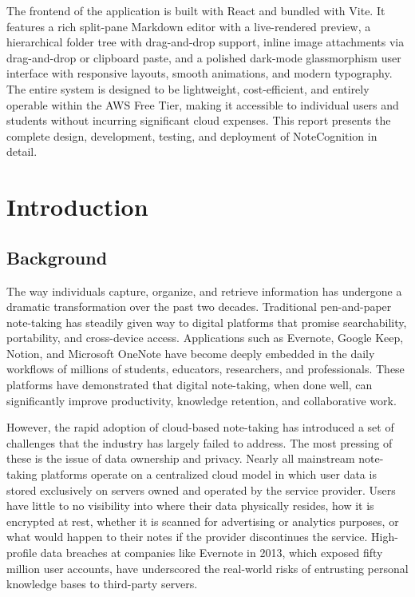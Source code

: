 \documentclass[12pt, a4paper, oneside]{report}
\begin{document}
The frontend of the application is built with React and bundled with Vite. It features a rich split-pane Markdown editor with a live-rendered preview, a hierarchical folder tree with drag-and-drop support, inline image attachments via drag-and-drop or clipboard paste, and a polished dark-mode glassmorphism user interface with responsive layouts, smooth animations, and modern typography. The entire system is designed to be lightweight, cost-efficient, and entirely operable within the AWS Free Tier, making it accessible to individual users and students without incurring significant cloud expenses. This report presents the complete design, development, testing, and deployment of NoteCognition in detail.

\tableofcontents
\listoffigures
{}
\listoftables
{}

\cleardoublepage
{}

\chapter{Introduction}

\section{Background}

The way individuals capture, organize, and retrieve information has undergone a dramatic transformation over the past two decades. Traditional pen-and-paper note-taking has steadily given way to digital platforms that promise searchability, portability, and cross-device access. Applications such as Evernote, Google Keep, Notion, and Microsoft OneNote have become deeply embedded in the daily workflows of millions of students, educators, researchers, and professionals. These platforms have demonstrated that digital note-taking, when done well, can significantly improve productivity, knowledge retention, and collaborative work.

However, the rapid adoption of cloud-based note-taking has introduced a set of challenges that the industry has largely failed to address. The most pressing of these is the issue of data ownership and privacy. Nearly all mainstream note-taking platforms operate on a centralized cloud model in which user data is stored exclusively on servers owned and operated by the service provider. Users have little to no visibility into where their data physically resides, how it is encrypted at rest, whether it is scanned for advertising or analytics purposes, or what would happen to their notes if the provider discontinues the service. High-profile data breaches at companies like Evernote in 2013, which exposed fifty million user accounts, have underscored the real-world risks of entrusting personal knowledge bases to third-party servers.
\end{document}
